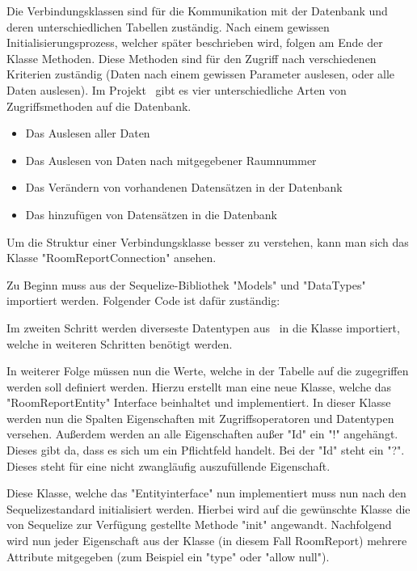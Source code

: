 
Die Verbindungsklassen sind für die Kommunikation mit der Datenbank und deren unterschiedlichen Tabellen zuständig. Nach einem gewissen Initialisierungsprozess, welcher später beschrieben wird, folgen am Ende der Klasse Methoden. Diese Methoden sind für den Zugriff nach verschiedenen Kriterien zuständig (Daten nach einem gewissen Parameter auslesen, oder alle Daten auslesen). Im Projekt \ZELIA\ gibt es vier unterschiedliche Arten von Zugriffsmethoden auf die Datenbank.

\begin{itemize}
    \item Das Auslesen aller Daten
    \item Das Auslesen von Daten nach mitgegebener Raumnummer
    \item Das Verändern von vorhandenen Datensätzen in der Datenbank
    \item Das hinzufügen von Datensätzen in die Datenbank
\end{itemize}

Um die Struktur einer Verbindungsklasse besser zu verstehen, kann man sich das Klasse "RoomReportConnection" ansehen.

Zu Beginn muss aus der Sequelize-Bibliothek "Models" und "DataTypes" importiert werden. Folgender Code ist dafür zuständig:


Im zweiten Schritt werden diverseste Datentypen aus \ZELIA\ in die Klasse importiert, welche in weiteren Schritten benötigt werden.

In weiterer Folge müssen nun die Werte, welche in der Tabelle auf die zugegriffen werden soll definiert werden. Hierzu erstellt man eine neue Klasse, welche das "RoomReportEntity" Interface beinhaltet und implementiert. In dieser Klasse werden nun die Spalten Eigenschaften mit Zugriffsoperatoren und Datentypen versehen. Außerdem werden an alle Eigenschaften außer "Id" ein "!" angehängt. Dieses gibt da, dass es sich um ein Pflichtfeld handelt. Bei der "Id" steht ein "?". Dieses steht für eine nicht zwangläufig auszufüllende Eigenschaft.


Diese Klasse, welche das "Entityinterface" nun implementiert muss nun nach den Sequelizestandard initialisiert werden. Hierbei wird auf die gewünschte Klasse die von Sequelize zur Verfügung gestellte Methode "init" angewandt. Nachfolgend wird nun jeder Eigenschaft aus der Klasse (in diesem Fall RoomReport) mehrere Attribute mitgegeben (zum Beispiel ein "type" oder "allow null").

